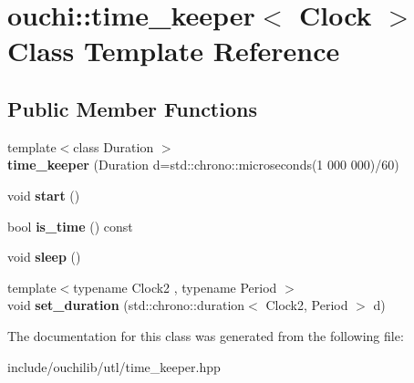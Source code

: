 \hypertarget{classouchi_1_1time__keeper}{}\section{ouchi\+::time\+\_\+keeper$<$ Clock $>$ Class Template Reference}
\label{classouchi_1_1time__keeper}
\subsection*{Public Member Functions}
\begin{DoxyCompactItemize}
\item 
\mbox{\label{classouchi_1_1time__keeper_aa0638e7bc759960294dc7d5113657bac}} 
{\footnotesize template$<$class Duration $>$ }\\{\bfseries time\+\_\+keeper} (Duration d=std\+::chrono\+::microseconds(1 \textquotesingle{}000 \textquotesingle{}000)/60)
\item 
\mbox{\label{classouchi_1_1time__keeper_aeb5ab40acbc0607fc0fa348bb50df4f0}} 
void {\bfseries start} ()
\item 
\mbox{\label{classouchi_1_1time__keeper_a2bd2ecbb464ab3bfd3f9f90c48c7f75b}} 
bool {\bfseries is\+\_\+time} () const
\item 
\mbox{\label{classouchi_1_1time__keeper_abe413b99387580e55b5720993dc8f32f}} 
void {\bfseries sleep} ()
\item 
\mbox{\label{classouchi_1_1time__keeper_a454bd920a2fcbec763da8fccfd2ee899}} 
{\footnotesize template$<$typename Clock2 , typename Period $>$ }\\void {\bfseries set\+\_\+duration} (std\+::chrono\+::duration$<$ Clock2, Period $>$ d)
\end{DoxyCompactItemize}


The documentation for this class was generated from the following file\+:\begin{DoxyCompactItemize}
\item 
include/ouchilib/utl/time\+\_\+keeper.\+hpp\end{DoxyCompactItemize}
